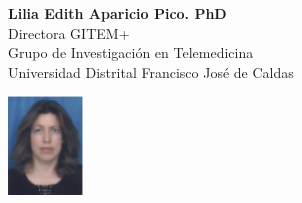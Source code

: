 \begin{figure}[!htpb]
\begin{minipage}[r]{0.8\textwidth}
\begin{flushright}
\textbf{Lilia Edith Aparicio Pico. PhD}
\\Directora GITEM+\\Grupo de Investigación en Telemedicina\\Universidad Distrital Francisco José de Caldas
\end{flushright}
\end{minipage}
\begin{minipage}[r]{0.15\textwidth}
 \includegraphics[width=20mm, height=26mm]{edith.png}
\end{minipage}
\end{figure}